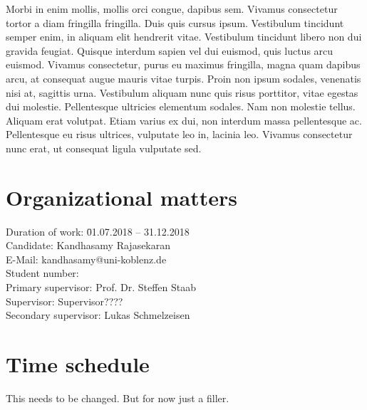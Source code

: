 \documentclass[a4paper, 11pt]{article}
\makeatletter
\newcommand{\myName}{Kandhasamy Rajasekaran}
\newcommand{\emailID}{kandhasamy@uni-koblenz.de}
\newcommand{\matriculationID}{216100855}
\newcommand{\StartDate}{01.07.2018}
\newcommand{\EndDate}{31.12.2018}
\newcommand{\expert}{Prof. Dr. Steffen Staab}%
\newcommand{\supervisor}{Supervisor????} %
\newcommand{\scndSupervisor}{Lukas Schmelzeisen} %
\makeatother
\begin{document}
Morbi in enim mollis, mollis orci congue, dapibus sem. Vivamus consectetur tortor a diam fringilla fringilla. Duis quis cursus ipsum. Vestibulum tincidunt semper enim, in aliquam elit hendrerit vitae. Vestibulum tincidunt libero non dui gravida feugiat. Quisque interdum sapien vel dui euismod, quis luctus arcu euismod. Vivamus consectetur, purus eu maximus fringilla, magna quam dapibus arcu, at consequat augue mauris vitae turpis. Proin non ipsum sodales, venenatis nisi at, sagittis urna. Vestibulum aliquam nunc quis risus porttitor, vitae egestas dui molestie. Pellentesque ultricies elementum sodales. Nam non molestie tellus. Aliquam erat volutpat. Etiam varius ex dui, non interdum massa pellentesque ac. Pellentesque eu risus ultrices, vulputate leo in, lacinia leo. Vivamus consectetur nunc erat, ut consequat ligula vulputate sed.
\newpage

\section{Organizational matters}

\begin{tabbing}
Duration of work: \hspace{1.1cm} \= \StartDate{} -- \EndDate{}\\
\vspace{0.5ex}Candidate:	\> \myName{}\\
\vspace{0.5ex}E-Mail:	\> \emailID{}\\
\vspace{0.5ex}Student number: \> \matriculationID{}\\
\vspace{0.5ex}Primary supervisor: \> \expert{}\\
Supervisor: \> \supervisor{}\\
Secondary supervisor: \> \scndSupervisor{}\\
\end{tabbing}


\section{Time schedule}

This needs to be changed. But for now just a filler.
\end{document}
